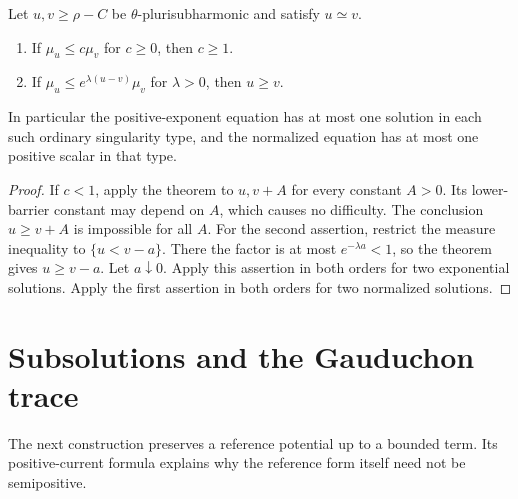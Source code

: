 \begin{corollary}\label{cor:big-barrier-orders}
Let $u,v\geq\rho-C$ be $\theta$-plurisubharmonic and satisfy $u\simeq v$.
\begin{enumerate}
\item If $\mu_u\leq c\mu_v$ for $c\geq0$, then $c\geq1$.
\item If $\mu_u\leq e^{\lambda(u-v)}\mu_v$ for $\lambda>0$, then $u\geq v$.
\end{enumerate}
In particular the positive-exponent equation has at most one solution in each such ordinary singularity type, and the normalized equation has at most one positive scalar in that type.
\end{corollary}
\begin{proof}
If $c<1$, apply the theorem to $u,v+A$ for every constant $A>0$. Its lower-barrier constant may depend on $A$, which causes no difficulty. The conclusion $u\geq v+A$ is impossible for all $A$. For the second assertion, restrict the measure inequality to $\{u<v-a\}$. There the factor is at most $e^{-\lambda a}<1$, so the theorem gives $u\geq v-a$. Let $a\downarrow0$. Apply this assertion in both orders for two exponential solutions. Apply the first assertion in both orders for two normalized solutions.
\end{proof}

\section{Subsolutions and the Gauduchon trace}
\label{sec:big-minimal-estimates}

The next construction preserves a reference potential up to a bounded term. Its positive-current formula explains why the reference form itself need not be semipositive.

